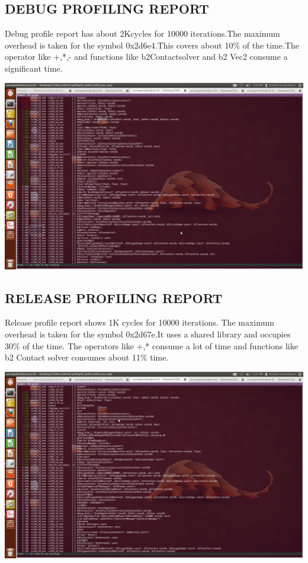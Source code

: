 \documentclass[11pt]{article}
\begin{document}
\subsection{DEBUG PROFILING REPORT}
Debug profile report has about 2Kcycles for 10000 iterations.The maximum overhead is taken for the symbol 0x2d6e4.This covers about 10\% of the time.The operator like +,*,- and functions like b2Contactsolver and b2 Vec2 consume 
a significant time.
\begin{center}
  \includegraphics[scale=.25]{debug.png}
\end{center}
\subsection{RELEASE PROFILING REPORT}
Release profile report shows 1K cycles for 10000 iterations. The maximum overhead is taken for the symbol 0x2d67e.It uses a shared library and occupies 30\% of the time.
The operators like +,* consume a lot of time and functions like b2 Contact solver consumes about 11\% time.
\begin{center}
  \includegraphics[scale=.3]{release.png}
\end{center}
\end{document}
